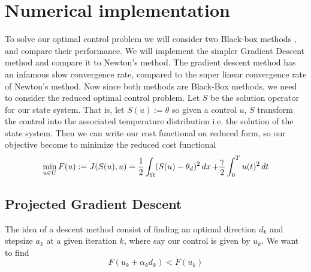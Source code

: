 \section{Numerical implementation}
To solve our optimal control problem we will consider two Black-box methods \cite{Algorithms}, and compare their performance. We will implement the simpler Gradient Descent method and compare it to Newton's method. The gradient descent method has an infamous slow convergence rate, compared to the super linear convergence rate of Newton's method. Now since both methods are Black-Box methods, we need to consider the reduced optimal control problem. Let $S$ be the solution operator for our state system. That is, let $S(u):=\theta$ so given a control $u$, $S$ transform the control into the associated temperature distribution i.e. the solution of the state system. Then we can write our cost functional on reduced form, so our objective become to minimize the reduced cost functional 
\begin{equation}
\label{eq:optimization_prob}
    \min_{u \in U}F(u) := J(S(u),u) = \frac{1}{2}\int_{\Omega}(S(u) - \theta_d)^2 \mathop{dx}+ \frac{\gamma}{2}\int_0^Tu(t)^2\mathop{dt}
\end{equation}


\subsection{Projected Gradient Descent}
The idea of a descent method consist of finding an optimal direction $d_k$ and stepsize $a_k$ at a given iteration $k$, where say our control is given by $u_k$. We want to find
\begin{equation*}
    F(u_k + \alpha_kd_k) < F(u_k)
\end{equation*}

